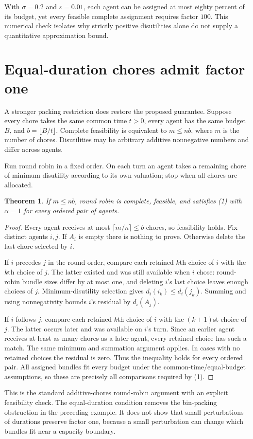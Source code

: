 \documentclass[11pt,a4paper]{article}
\newtheorem{theorem}{Theorem}[section]
\begin{document}
With $\sigma=0.2$ and $\varepsilon=0.01$, each agent can be assigned at most eighty percent of its budget, yet every feasible complete assignment requires factor $100$. This numerical check isolates why strictly positive disutilities alone do not supply a quantitative approximation bound.
\section{Equal-duration chores admit factor one}
A stronger packing restriction does restore the proposed guarantee. Suppose every chore takes the same common time $t>0$, every agent has the same budget $B$, and $b=\lfloor B/t\rfloor$. Complete feasibility is equivalent to $m\le nb$, where $m$ is the number of chores. Disutilities may be arbitrary additive nonnegative numbers and differ across agents.

Run round robin in a fixed order. On each turn an agent takes a remaining chore of minimum disutility according to its own valuation; stop when all chores are allocated.
\begin{theorem}
If $m\le nb$, round robin is complete, feasible, and satisfies (1) with $\alpha=1$ for every ordered pair of agents.
\end{theorem}
\begin{proof}
Every agent receives at most $\lceil m/n\rceil\le b$ chores, so feasibility holds. Fix distinct agents $i,j$. If $A_i$ is empty there is nothing to prove. Otherwise delete the last chore selected by $i$.

If $i$ precedes $j$ in the round order, compare each retained $k$th choice of $i$ with the $k$th choice of $j$. The latter existed and was still available when $i$ chose: round-robin bundle sizes differ by at most one, and deleting $i$'s last choice leaves enough choices of $j$. Minimum-disutility selection gives $d_i(i_k)\le d_i(j_k)$. Summing and using nonnegativity bounds $i$'s residual by $d_i(A_j)$.

If $i$ follows $j$, compare each retained $k$th choice of $i$ with the $(k+1)$st choice of $j$. The latter occurs later and was available on $i$'s turn. Since an earlier agent receives at least as many chores as a later agent, every retained choice has such a match. The same minimum and summation argument applies. In cases with no retained choices the residual is zero. Thus the inequality holds for every ordered pair. All assigned bundles fit every budget under the common-time/equal-budget assumptions, so these are precisely all comparisons required by (1).
\end{proof}
This is the standard additive-chores round-robin argument with an explicit feasibility check. The equal-duration condition removes the bin-packing obstruction in the preceding example. It does not show that small perturbations of durations preserve factor one, because a small perturbation can change which bundles fit near a capacity boundary.
\end{document}
